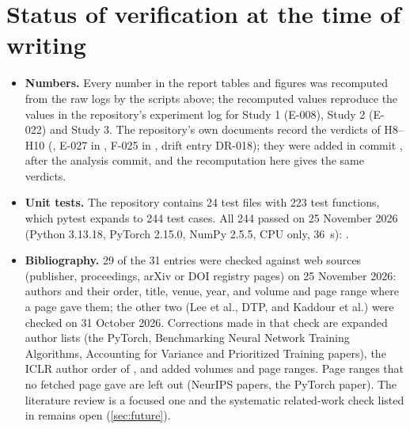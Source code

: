 \section{Status of verification at the time of writing}
\begin{itemize}
\item \textbf{Numbers.} Every number in the report tables and figures was recomputed from the raw logs by the scripts above; the recomputed values reproduce the values in the repository's experiment log for Study 1 (E-008), Study 2 (E-022) and Study 3. The repository's own documents record the verdicts of H8--H10 (, E-027 in , F-025 in , drift entry DR-018); they were added in commit , after the analysis commit, and the recomputation here gives the same verdicts.
\item \textbf{Unit tests.} The repository contains 24 test files with 223 test functions, which pytest expands to 244 test cases. All 244 passed on 25 November 2026 (Python 3.13.18, PyTorch 2.15.0, NumPy 2.5.5, CPU only, 36~s): .
\item \textbf{Bibliography.} 29 of the 31 entries were checked against web sources (publisher, proceedings, arXiv or DOI registry pages) on 25 November 2026: authors and their order, title, venue, year, and volume and page range where a page gave them; the other two (Lee et al., DTP, and Kaddour et al.) were checked on 31 October 2026. Corrections made in that check are expanded author lists (the PyTorch, Benchmarking Neural Network Training Algorithms, Accounting for Variance and Prioritized Training papers), the ICLR author order of \citet{dehghani2022efficiency}, and added volumes and page ranges. Page ranges that no fetched page gave are left out (NeurIPS papers, the PyTorch paper). The literature review is a focused one and the systematic related-work check listed in  remains open (\cref{sec:future}).
\end{itemize}
